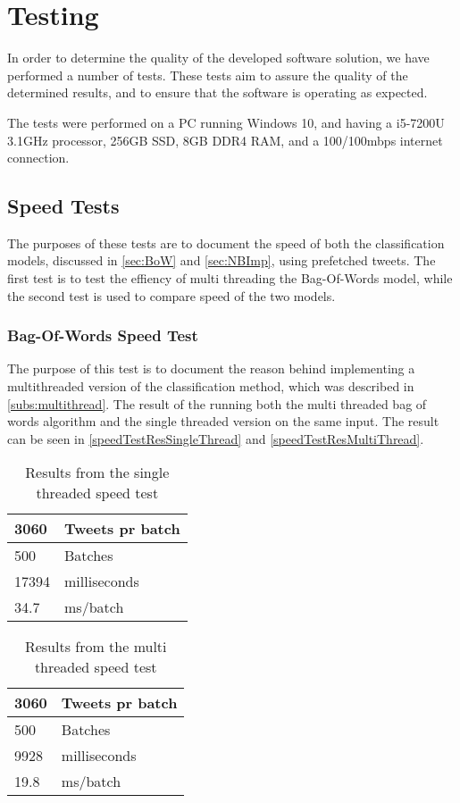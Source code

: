 \chapter{Testing}\label{cha:testing}
In order to determine the quality of the developed software solution, we have
performed a number of tests. These tests aim to assure the quality of the
determined results, and to ensure that the software is operating as
expected.\nl

The tests were performed on a PC running Windows 10, and having a i5-7200U
3.1GHz processor, 256GB SSD, 8GB DDR4 RAM, and a 100/100mbps internet
connection.

\section{Speed Tests}\label{speedtestlavel}
The purposes of these tests are to document the speed of both the
classification models, discussed in \autoref{sec:BoW} and
\autoref{sec:NBImp}, using prefetched tweets. The first test is to test the
effiency of multi threading the Bag-Of-Words model, while the second test is
used to compare speed of the two models.

\subsection{Bag-Of-Words Speed Test}\label{test:multithread}
The purpose of this test is to document the reason behind implementing a
multithreaded version of the classification method, which was described in
\autoref{subs:multithread}. 
The result of the running both the multi threaded bag of words algorithm and the
single threaded version on the same input. The result can be seen in
\autoref{speedTestResSingleThread} and \autoref{speedTestResMultiThread}.

\begin{table}[H]\centering
\begin{tabular}{|l|l|}
\hline
3060	&	Tweets pr batch 	\\\hline
500		&	Batches				\\\hline
17394	&	milliseconds		\\\hline
34.7	&	ms/batch 			\\\hline
\end{tabular}
\caption{Results from the single threaded speed test}
\label{speedTestResSingleThread}
\end{table}

\begin{table}[H]\centering
\begin{tabular}{|l|l|}
\hline
3060	&	Tweets pr batch 	\\\hline
500		&	Batches				\\\hline
9928 	&	milliseconds		\\\hline
19.8	&	ms/batch 			\\\hline
\end{tabular}
\caption{Results from the multi threaded speed test}
\label{speedTestResMultiThread}
\end{table}

